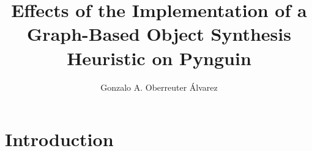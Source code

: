 \documentclass[%
  chapterprefix=false,%
  open=right,%
  twoside=true,%
  paper=a4,%
  logofile={Figures/logo.png},%
  thesistype=master,%
  UKenglish,%
]{se2thesis}
\author{Gonzalo A. Oberreuter Álvarez}
\title{Effects of the Implementation of a Graph-Based Object Synthesis Heuristic on Pynguin}
\institute{Chair of Software Engineering}
\begin{document}
\frontmatter

\maketitle

\mainmatter{}

\chapter{Introduction}
\end{document}
